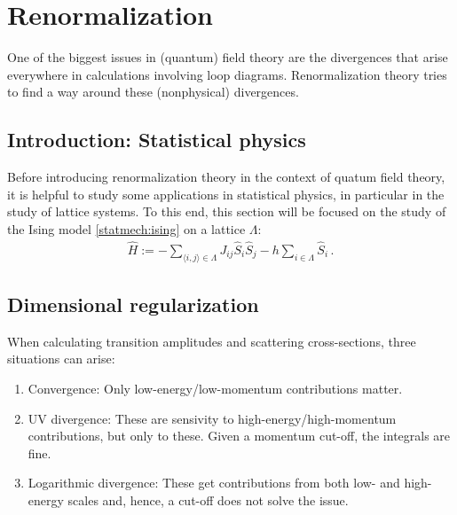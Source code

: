 
\section{Renormalization}

    One of the biggest issues in (quantum) field theory are the divergences that arise everywhere in calculations involving loop diagrams. Renormalization theory tries to find a way around these (nonphysical) divergences.

\subsection{Introduction: Statistical physics}

    Before introducing renormalization theory in the context of quatum field theory, it is helpful to study some applications in statistical physics, in particular in the study of lattice systems. To this end, this section will be focused on the study of the Ising model \ref{statmech:ising} on a lattice $\Lambda$:
    \begin{gather}
        \widehat{H} := -\sum_{\langle i,j \rangle\in\Lambda}J_{ij}\widehat{S}_i\widehat{S}_j-h\sum_{i\in\Lambda}\widehat{S}_i\,.
    \end{gather}

\subsection{Dimensional regularization}

    When calculating transition amplitudes and scattering cross-sections, three situations can arise:
    \begin{enumerate}
        \item Convergence: Only low-energy/low-momentum contributions matter.
        \item UV divergence: These are sensivity to high-energy/high-momentum contributions, but only to these. Given a momentum cut-off, the integrals are fine.
        \item Logarithmic divergence: These get contributions from both low- and high-energy scales and, hence, a cut-off does not solve the issue.
    \end{enumerate}

